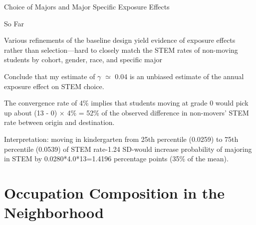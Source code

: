 \documentclass[aspectratio=169,xcolor=dvipsnames]{beamer}
\newenvironment{wideitemize}{\itemize\addtolength{\itemsep}{10pt}}{\enditemize}
\begin{document}
\begin{frame}{Choice of Majors and Major Specific Exposure Effects}\label{tab_major_spec}
    \begin{table}[!htbp]
	\centering \footnotesize
	\captionsetup{width=1.0\textwidth}
\end{table}
\hyperlink{tab_major_spec_narrow}{}
\end{frame}

\begin{frame}{So Far}\label{}
\begin{wideitemize}
    \item Various refinements of the baseline design yield evidence of exposure effects rather than selection---hard to closely match the STEM rates of non-moving students by cohort, gender, race, and specific major
    \item Conclude that my estimate of $\gamma$ $\simeq$ 0.04 is an unbiased estimate of the annual exposure effect on STEM choice. 
    \item The convergence rate of 4\% implies that students moving at grade 0 would pick up about (13 - 0) $\times$ 4\% = 52\% of the observed difference in non-movers’ STEM rate between origin and destination.
    \item Interpretation: moving in kindergarten from 25th percentile (0.0259) to 75th percentile (0.0539) of STEM rate-1.24 SD-would increase probability of majoring in STEM by 0.0280*4.0*13=1.4196 percentage points (35\% of the mean).
    
\end{wideitemize}

\end{frame}

\section{Occupation Composition in the Neighborhood}
\end{document}
